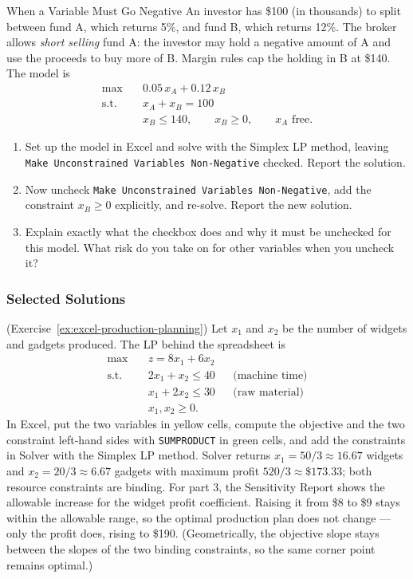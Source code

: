
\begin{ex}{When a Variable Must Go Negative}{}
\label{ex:excel-short-selling}
 An investor has \$100 (in thousands) to split between fund A, which returns 5\%, and fund B, which returns 12\%.  The broker allows \emph{short selling} fund A: the investor may hold a negative amount of A and use the proceeds to buy more of B.  Margin rules cap the holding in B at \$140.  The model is
\begin{align*}
\max \quad & 0.05\,x_A + 0.12\,x_B\\
\text{s.t.} \quad & x_A + x_B = 100\\
& x_B \leq 140, \qquad x_B \geq 0, \qquad x_A \text{ free}.
\end{align*}
\begin{enumerate}
\item Set up the model in Excel and solve with the Simplex LP method, leaving \texttt{Make Unconstrained Variables Non-Negative} checked.  Report the solution.
\item Now uncheck \texttt{Make Unconstrained Variables Non-Negative}, add the constraint $x_B \geq 0$ explicitly, and re-solve.  Report the new solution.
\item Explain exactly what the checkbox does and why it must be unchecked for this model.  What risk do you take on for other variables when you uncheck it?
\end{enumerate}
\exrefs{\S\ref{sec:excel-solver}}
\end{ex}

\subsubsection*{Selected Solutions}

\begin{solution}(Exercise~\ref{ex:excel-production-planning})
Let $x_1$ and $x_2$ be the number of widgets and gadgets produced.  The LP behind the spreadsheet is
\begin{align*}
\max \quad & z = 8x_1 + 6x_2\\
\text{s.t.} \quad & 2x_1 + x_2 \leq 40 && \text{(machine time)}\\
& x_1 + 2x_2 \leq 30 && \text{(raw material)}\\
& x_1, x_2 \geq 0.
\end{align*}
In Excel, put the two variables in yellow cells, compute the objective and the two constraint left-hand sides with \texttt{SUMPRODUCT} in green cells, and add the constraints in Solver with the Simplex LP method.  Solver returns $x_1 = 50/3 \approx 16.67$ widgets and $x_2 = 20/3 \approx 6.67$ gadgets with maximum profit $520/3 \approx \$173.33$; both resource constraints are binding.
For part 3, the Sensitivity Report shows the allowable increase for the widget profit coefficient.  Raising it from \$8 to \$9 stays within the allowable range, so the optimal production plan does not change --- only the profit does, rising to \$190.  (Geometrically, the objective slope stays between the slopes of the two binding constraints, so the same corner point remains optimal.)
\end{solution}

